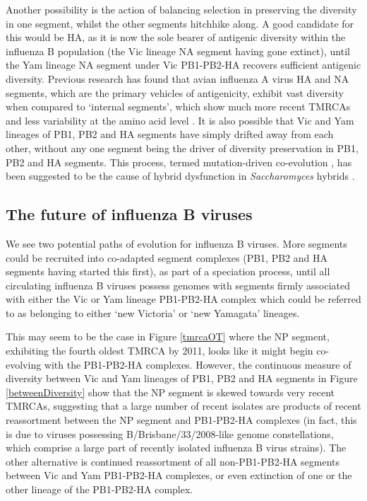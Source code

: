 \documentclass[11pt,oneside,letterpaper]{article}
\begin{document}
Another possibility is the action of balancing selection in preserving the diversity in one segment, whilst the other segments hitchhike along.
A good candidate for this would be HA, as it is now the sole bearer of antigenic diversity within the influenza B population (the Vic lineage NA segment having gone extinct), until the Yam lineage NA segment under Vic PB1-PB2-HA recovers sufficient antigenic diversity.
Previous research has found that avian influenza A virus HA and NA segments, which are the primary vehicles of antigenicity, exhibit vast diversity when compared to `internal segments', which show much more recent TMRCAs and less variability at the amino acid level \cite{chen2006,obenauer2006}.
It is also possible that Vic and Yam lineages of PB1, PB2 and HA segments have simply drifted away from each other, without any one segment being the driver of diversity preservation in PB1, PB2 and HA segments.
This process, termed mutation-driven co-evolution \cite{presgraves2010}, has been suggested to be the cause of hybrid dysfunction in \textit{Saccharomyces} hybrids \cite{lee2008}.

\subsection*{The future of influenza B viruses}
We see two potential paths of evolution for influenza B viruses.
More segments could be recruited into co-adapted segment complexes (PB1, PB2 and HA segments having started this first), as part of a speciation process, until all circulating influenza B viruses possess genomes with segments firmly associated with either the Vic or Yam lineage PB1-PB2-HA complex which could be referred to as belonging to either `new Victoria' or `new Yamagata' lineages.

This may seem to be the case in Figure \ref{tmrcaOT} where the NP segment, exhibiting the fourth oldest TMRCA by 2011, looks like it might begin co-evolving with the PB1-PB2-HA complexes. 
However, the continuous measure of diversity between Vic and Yam lineages of PB1, PB2 and HA segments in Figure \ref{betweenDiversity} show that the NP segment is skewed towards very recent TMRCAs, suggesting that a large number of recent isolates are products of recent reassortment between the NP segment and PB1-PB2-HA complexes (in fact, this is due to viruses possessing B/Brisbane/33/2008-like genome constellations, which comprise a large part of recently isolated influenza B virus strains).
The other alternative is continued reassortment of all non-PB1-PB2-HA segments between Vic and Yam PB1-PB2-HA complexes, or even extinction of one or the other lineage of the PB1-PB2-HA complex.
\end{document}
